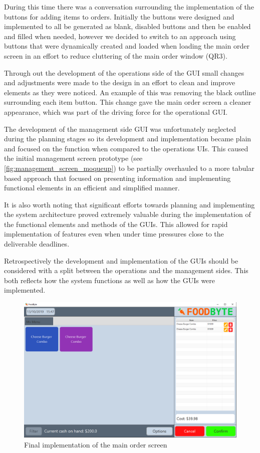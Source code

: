 During this time there was a conversation surrounding the implementation of the buttons for adding items to orders. Initially the buttons were designed and implemented to all be generated as blank, disabled buttons and then be enabled and filled when needed, however we decided to switch to an approach using buttons that were dynamically created and loaded when loading the main order screen in an effort to reduce cluttering of the main order window (QR3).

Through out the development of the operations side of the GUI small changes and adjustments were made to the design in an effort to clean and improve elements as they were noticed. An example of this was removing the black outline surrounding each item button. This change gave the main order screen a cleaner appearance, which was part of the driving force for the operational GUI.

The development of the management side GUI was unfortunately neglected during the planning stages so its development and implementation became plain and focused on the function when compared to the operations UIs. This caused the initial management screen prototype (see \ref{fig:management_screen_moqueup}) to be partially overhauled to a more tabular based approach that focused on presenting information and implementing functional elements in an efficient and simplified manner.

It is also worth noting that significant efforts towards planning and implementing the system architecture proved extremely valuable during the implementation of the functional elements and methods of the GUIs. This allowed for rapid implementation of features even when under time pressures close to the deliverable deadlines.

Retrospectively the development and implementation of the GUIs should be considered with a split between the operations and the management sides. This both reflects how the system functions as well as how the GUIs were implemented.

\pagebreak

\begin{figure}[h]
	\centering
	\includegraphics[width=150mm]{images/Final_GUI/main_order_screen.png}
	\caption{Final implementation of the main order screen}
	\label{fig:final_order_screen}
\end{figure}

